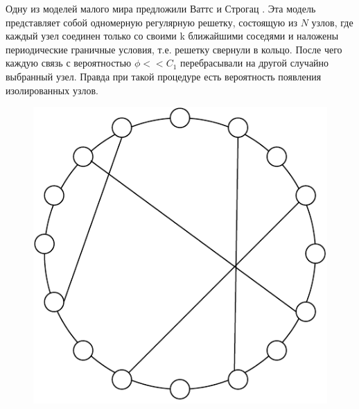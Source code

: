 \documentclass[a4paper]{article}
\begin{document}
Одну из моделей малого мира предложили Ваттс и Строгац \cite{litlink6}. Эта модель представляет собой одномерную регулярную решетку, состоящую из $N$ узлов,
 где каждый узел соединен только со своими k ближайшими соседями и наложены периодические граничные условия, т.е. решетку свернули в кольцо. После чего каждую связь с вероятностью $\phi << C_1$ перебрасывали на другой случайно выбранный узел.
 Правда при такой процедуре есть вероятность появления изолированных узлов.

 \begin{figure}[H]
    \begin{center}
	\begin{minipage}[h]{0.4\linewidth}
	\includegraphics[width=1\linewidth]{2соседа.pdf}
	\end{minipage}
	\hfill 
	\begin{minipage}[h]{0.4\linewidth}

\end{minipage}
\end{center}
\end{figure}
\end{document}
